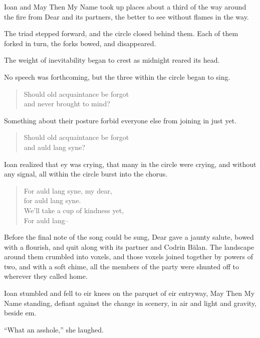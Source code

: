 Ioan and May Then My Name took up places about a third of the way around the fire from Dear and its partners, the better to see without flames in the way.

The triad stepped forward, and the circle closed behind them. Each of them forked in turn, the forks bowed, and disappeared.

The weight of inevitability began to crest as midnight reared its head.

No speech was forthcoming, but the three within the circle began to sing.

\begin{quote}
Should old acquaintance be forgot\\
and never brought to mind?
\end{quote}

Something about their posture forbid everyone else from joining in just yet.

\begin{quote}
Should old acquaintance be forgot\\
and auld lang syne?
\end{quote}

Ioan realized that ey was crying, that many in the circle were crying, and without any signal, all within the circle burst into the chorus.

\begin{quote}
For auld lang syne, my dear,\\
for auld lang syne.\\
We'll take a cup of kindness yet,\\
For auld lang--
\end{quote}

Before the final note of the song could be sung, Dear gave a jaunty salute, bowed with a flourish, and quit along with its partner and Codrin Bălan. The landscape around them crumbled into voxels, and those voxels joined together by powers of two, and with a soft chime, all the members of the party were shunted off to wherever they called home.

Ioan stumbled and fell to eir knees on the parquet of eir entryway, May Then My Name standing, defiant against the change in scenery, in air and light and gravity, beside em.

``What an asshole,'' she laughed.
